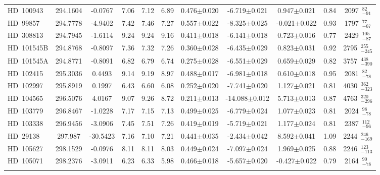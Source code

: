 {\begin{longtable}{lcccccccccc}
HD~100943 & 294.1604 & -0.0767 & 7.06 & 7.12 & 6.89 & 0.476$\pm$0.020 & -6.719$\pm$0.021 & 0.947$\pm$0.021 & 0.84 & 2097~$_{-91}^{82}$ \\
\noalign{\smallskip}
HD~99857 & 294.7778 & -4.9402 & 7.42 & 7.46 & 7.27 & 0.557$\pm$0.022 & -8.325$\pm$0.025 & -0.021$\pm$0.022 & 0.93 & 1797~$_{-67}^{77}$ \\
\noalign{\smallskip}
HD~308813 & 294.7945 & -1.6114 & 9.24 & 9.24 & 9.16 & 0.411$\pm$0.018 & -6.141$\pm$0.018 & 0.723$\pm$0.016 & 0.77 & 2429~$_{-87}^{105}$ \\
\noalign{\smallskip}
HD~101545B & 294.8768 & -0.8097 & 7.36 & 7.32 & 7.26 & 0.360$\pm$0.028 & -6.435$\pm$0.029 & 0.823$\pm$0.031 & 0.92 & 2795~$_{-245}^{255}$ \\
\noalign{\smallskip}
HD~101545A & 294.8771 & -0.8091 & 6.82 & 6.79 & 6.74 & 0.275$\pm$0.028 & -6.551$\pm$0.029 & 0.659$\pm$0.029 & 0.82 & 3757~$_{-390}^{438}$ \\
\noalign{\smallskip}
HD~102415 & 295.3036 & 0.4493 & 9.14 & 9.19 & 8.97 & 0.488$\pm$0.017 & -6.981$\pm$0.018 & 0.610$\pm$0.018 & 0.95 & 2081~$_{-78}^{82}$ \\
\noalign{\smallskip}
HD~102997 & 295.8919 & 0.1997 & 6.43 & 6.60 & 6.08 & 0.252$\pm$0.020 & -7.741$\pm$0.020 & 1.127$\pm$0.021 & 0.81 & 4030~$_{-323}^{362}$ \\
\noalign{\smallskip}
HD~104565 & 296.5076 & 4.0167 & 9.07 & 9.26 & 8.72 & 0.211$\pm$0.013 & -14.088$\pm$0.012 & 5.713$\pm$0.013 & 0.87 & 4763~$_{-296}^{320}$ \\
\noalign{\smallskip}
HD~103779 & 296.8467 & -1.0228 & 7.17 & 7.15 & 7.13 & 0.499$\pm$0.025 & -6.779$\pm$0.024 & 1.077$\pm$0.023 & 0.81 & 2024~$_{-78}^{98}$ \\
\noalign{\smallskip}
HD~103338 & 296.9456 & -3.0906 & 7.45 & 7.51 & 7.26 & 0.419$\pm$0.019 & -5.719$\pm$0.021 & 1.177$\pm$0.024 & 0.81 & 2387~$_{-96}^{112}$ \\
\noalign{\smallskip}
HD~29138 & 297.987 & -30.5423 & 7.16 & 7.10 & 7.21 & 0.441$\pm$0.035 & -2.434$\pm$0.042 & 8.592$\pm$0.041 & 1.09 & 2244~$_{-169}^{246}$ \\
\noalign{\smallskip}
HD~105627 & 298.1529 & -0.0976 & 8.11 & 8.11 & 8.03 & 0.449$\pm$0.024 & -7.097$\pm$0.024 & 1.969$\pm$0.025 & 0.88 & 2246~$_{-113}^{123}$ \\
\noalign{\smallskip}
HD~105071 & 298.2376 & -3.0911 & 6.23 & 6.33 & 5.98 & 0.466$\pm$0.018 & -5.657$\pm$0.020 & -0.427$\pm$0.022 & 0.79 & 2164~$_{-78}^{90}$ \\
\noalign{\smallskip}

\end{longtable}}
